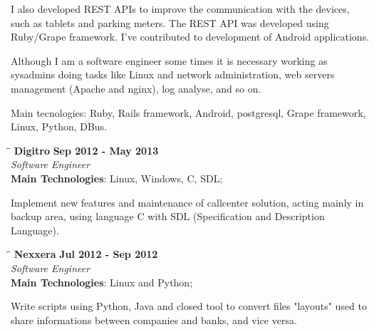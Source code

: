 \documentclass[margin]{res}
\begin{document}
\begin{resume}
I also developed REST APIs to improve the communication with the devices, such as tablets and parking meters. The REST API was developed using Ruby/Grape framework. I've contributed to development of Android applications.

Although I am a software engineer some times it is necessary working as sysadmins doing tasks like Linux and network administration, web servers management (Apache and nginx), log analyse, and so on.

Main tecnologies: Ruby, Rails framework, Android, postgresql, Grape framework, Linux, Python, DBus.

\vspace{-0.1in}
   \begin{tabbing}
   \hspace{2.3in}\= \hspace{1.7in}\= \kill %
    \textbf{Digitro}    \>\>\textbf{Sep 2012 - May 2013}\\
    \textit{Software Engineer}\\        
    \textbf{Main Technologies}: Linux, Windows, C, SDL;
   \end{tabbing}\vspace{-20pt}      %
    \vspace{2mm}
Implement new features and maintenance of callcenter solution, acting mainly
in backup area, using language C with SDL (Specification and Description Language).

    
   \begin{tabbing}
   \hspace{2.3in}\= \hspace{1.7in}\= \kill %
    \textbf{Nexxera}    \>\>\textbf{Jul 2012 - Sep 2012}\\
    \textit{Software Engineer}\\   
    \textbf{Main Technologies}: Linux and Python;
   \end{tabbing}\vspace{-20pt}      %
    \vspace{2mm}

    Write scripts using Python, Java and closed tool to convert files "layouts" used to share informations between companies and banks, and vice versa.
   

\end{resume}
\end{document}
